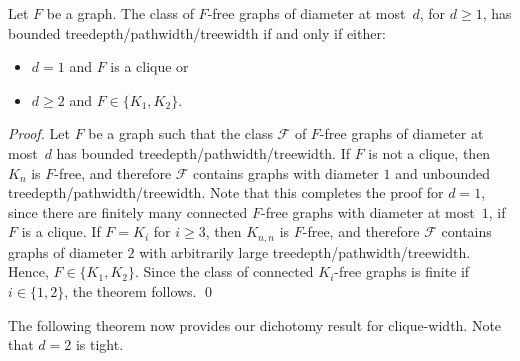 \documentclass[runningheads,envcountsame]{llncs}
\newcommand{\forbiddenGraph}{F}
\newcommand{\forbiddenClass}{\mathcal{F}}
\begin{document}
\begin{theorem}\label{thm:subgraphdec}
  Let $\forbiddenGraph$ be a graph.
  The class of $\forbiddenGraph$-free graphs of diameter at most~$d$, for $d\geq
  1$, has bounded treedepth/pathwidth/treewidth if and only if either:
  \begin{itemize}
  \item $d=1$ and $\forbiddenGraph$ is a clique or
  \item $d\geq 2$ and $\forbiddenGraph\in \{K_1,K_2\}$. 
  \end{itemize}
\end{theorem}
\begin{proof}
  Let $\forbiddenGraph$ be a graph such that the class $\forbiddenClass$ of
  $\forbiddenGraph$-free graphs of diameter at most~$d$ has bounded treedepth/pathwidth/treewidth. If $\forbiddenGraph$ is not a clique, then $K_n$ is
  $\forbiddenGraph$-free, and therefore $\forbiddenClass$ contains
  graphs with diameter $1$ and unbounded treedepth/pathwidth/treewidth. Note that this completes the proof for $d=1$, since there are finitely many connected 
  $F$-free graphs with diameter at most~$1$, if $F$ is a clique.
  If $\forbiddenGraph=K_i$ for $i\geq3$, then $K_{n,n}$ is
  $\forbiddenGraph$-free, and therefore $\forbiddenClass$ contains
  graphs of diameter $2$ with arbitrarily large treedepth/pathwidth/treewidth. Hence,
  $\forbiddenGraph \in \{K_1, K_2\}$. Since the class of connected $K_i$-free
  graphs is finite if $i \in \{1,2\}$, the
  theorem follows. \qed
\end{proof}
The following theorem now provides our dichotomy result for
clique-width. Note that $d=2$ is tight.
\end{document}

